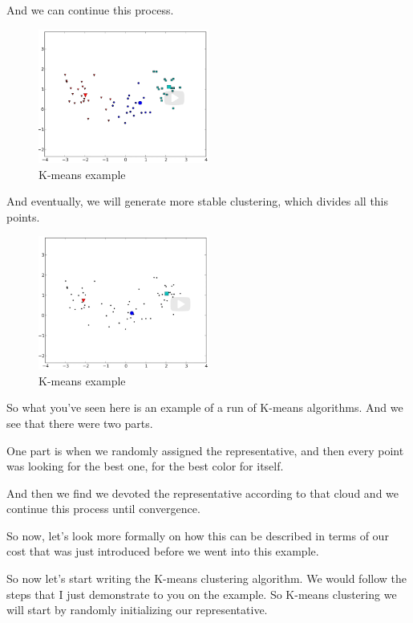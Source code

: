 \documentclass[a4paper, 12pt]{article}
\begin{document}
And we can continue this process.

\begin{figure}[H]
\centering
\includegraphics[width=0.5\textwidth]{./pic/k-means-06.png}
\caption{\label{fig:org036a1db}K-means example}
\end{figure}

And eventually, we will generate more stable clustering, which divides all this
points.

\begin{figure}[H]
\centering
\includegraphics[width=0.5\textwidth]{./pic/k-means-07.png}
\caption{\label{fig:org6a4045d}K-means example}
\end{figure}

So what you've seen here is an example of a run of K-means algorithms.
And we see that there were two parts.

One part is when we randomly assigned the representative, and then every point
was looking for the best one, for the best color for itself.

And then we find we devoted the representative according to that cloud and we
continue this process until convergence.

So now, let's look more formally on how this can be described in terms of our
cost that was just introduced before we went into this example.

So now let's start writing the K-means clustering algorithm. We would follow the
steps that I just demonstrate to you on the example. So K-means clustering we
will start by randomly initializing our representative.
\end{document}
